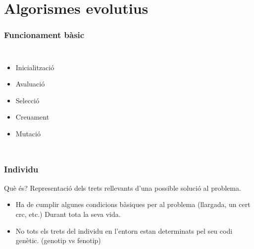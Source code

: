 \documentclass{beamer}
\begin{document}
\section{Algorismes evolutius} %
\label{sec:Algorismes evolutius}

\begin{frame}
	\frametitle{Funcionament bàsic}
	\begin{columns}[c]
		\begin{itemize}
			\item Inicialització
			\item Avaluació
			\item Selecció
			\item Creuament
			\item Mutació
		\end{itemize}
	\end{columns}
\end{frame}

\begin{frame}
	\frametitle{Individu}
	\begin{block}{Què és?}
		Representació dels trets rellevants d'una possible solució al problema.
	 \end{block}
	\pause
	\begin{itemize}
		\item Ha de cumplir algunes condicions bàsiques per al problema (llargada, un cert crc,
			etc.) Durant tota la seva vida.
		\item No tots els trets del individu en l'entorn estan determinats pel seu codi genètic.
			(genotip vs fenotip)
	\end{itemize}
\end{frame}
\end{document}
